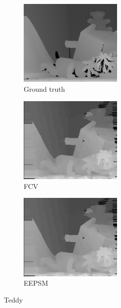 \begin{figure}[ht]
  \centering
  \begin{subfigure}[t]{0.3\textwidth}
    \centering\includegraphics[width=5cm]{figures/ted_gt}
    \caption{Ground truth \cite{Scharstein2003}\label{fig:ted_gt}}
  \end{subfigure}\hspace{0.5cm}
  \begin{subfigure}[t]{0.3\textwidth}
    \centering\includegraphics[width=5cm]{figures/ted_fcv}
    \caption{FCV\label{fig:ted_fcv}}
  \end{subfigure}\hspace{0.5cm}
  \begin{subfigure}[t]{0.3\textwidth}
    \centering\includegraphics[width=5cm]{figures/ted_fcv}
    \caption{EEPSM\label{fig:ted_eepsm}}
  \end{subfigure}
  \caption{Teddy \label{fig:tedall}}
\end{figure}


